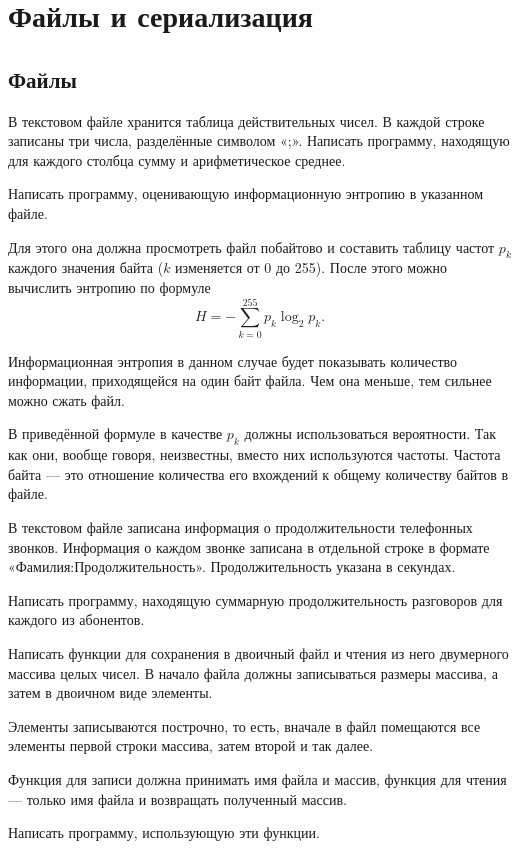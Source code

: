 \section{Файлы и сериализация}

\subsection{Файлы}

\task В текстовом файле хранится таблица действительных чисел. В
каждой строке записаны три числа, разделённые символом «;». Написать
программу, находящую для каждого столбца сумму и арифметическое
среднее.

\task Написать программу, оценивающую информационную энтропию в
указанном файле.

Для этого она должна просмотреть файл побайтово и составить таблицу
частот $p_k$ каждого значения байта ($k$ изменяется от 0 до
255). После этого можно вычислить энтропию по формуле
\[
H = - \sum_{k=0}^{255} p_k \log_2 p_k.
\]

Информационная энтропия в данном случае будет показывать количество
информации, приходящейся на один байт файла. Чем она меньше, тем
сильнее можно сжать файл.

В приведённой формуле в качестве $p_k$ должны использоваться
вероятности. Так как они, вообще говоря, неизвестны, вместо них
используются частоты. Частота байта — это отношение количества его
вхождений к общему количеству байтов в файле.

\task В текстовом файле записана информация о продолжительности
телефонных звонков.  Информация о каждом звонке записана в отдельной
строке в формате «Фамилия:Продолжительность». Продолжительность
указана в секундах.

Написать программу, находящую суммарную продолжительность разговоров
для каждого из абонентов.

\task Написать функции для сохранения в двоичный файл и чтения из него
двумерного массива целых чисел. В начало файла должны записываться
размеры массива, а затем в двоичном виде элементы.

Элементы записываются построчно, то есть, вначале в файл помещаются
все элементы первой строки массива, затем второй и так далее.

Функция для записи должна принимать имя файла и массив, функция для
чтения — только имя файла и возвращать полученный массив.

Написать программу, использующую эти функции.

